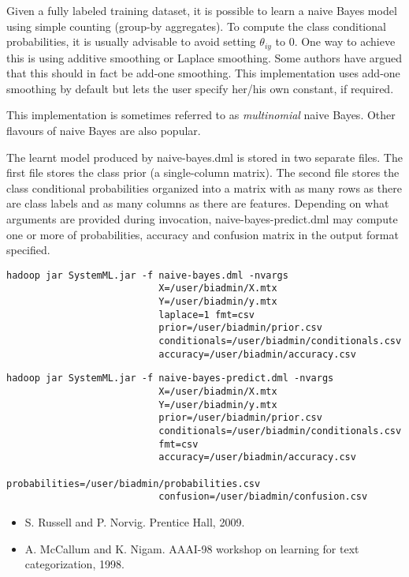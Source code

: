 Given a fully labeled training dataset, it is possible to learn a naive Bayes 
model using simple counting (group-by aggregates). To compute the class conditional
probabilities, it is usually advisable to avoid setting $\theta_{iy}$ to 0. One way to 
achieve this is using additive smoothing or Laplace smoothing. Some authors have argued
that this should in fact be add-one smoothing. This implementation uses add-one smoothing
by default but lets the user specify her/his own constant, if required.

This implementation is sometimes referred to as \emph{multinomial} naive Bayes. Other
flavours of naive Bayes are also popular.
\\


The learnt model produced by naive-bayes.dml is stored in two separate files. 
The first file stores the class prior (a single-column matrix). The second file 
stores the class conditional probabilities organized into a matrix with as many 
rows as there are class labels and as many columns as there are features. 
Depending on what arguments are provided during invocation, naive-bayes-predict.dml 
may compute one or more of probabilities, accuracy and confusion matrix in the 
output format specified. 
\\


\begin{verbatim}
hadoop jar SystemML.jar -f naive-bayes.dml -nvargs 
                           X=/user/biadmin/X.mtx 
                           Y=/user/biadmin/y.mtx 
                           laplace=1 fmt=csv
                           prior=/user/biadmin/prior.csv
                           conditionals=/user/biadmin/conditionals.csv
                           accuracy=/user/biadmin/accuracy.csv
\end{verbatim}

\begin{verbatim}
hadoop jar SystemML.jar -f naive-bayes-predict.dml -nvargs 
                           X=/user/biadmin/X.mtx 
                           Y=/user/biadmin/y.mtx 
                           prior=/user/biadmin/prior.csv
                           conditionals=/user/biadmin/conditionals.csv
                           fmt=csv
                           accuracy=/user/biadmin/accuracy.csv
                           probabilities=/user/biadmin/probabilities.csv
                           confusion=/user/biadmin/confusion.csv
\end{verbatim}


\begin{itemize}
\item S. Russell and P. Norvig.  Prentice Hall, 2009.
\item A. McCallum and K. Nigam.  
\newblock AAAI-98 workshop on learning for text categorization, 1998.
\end{itemize}
